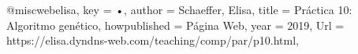 @misc{webelisa,
key = {•},
author = {Schaeffer, Elisa},
title = {Práctica 10: Algoritmo genético},
howpublished = {Página Web},
year = {2019},
Url = {https://elisa.dyndns-web.com/teaching/comp/par/p10.html},
}

